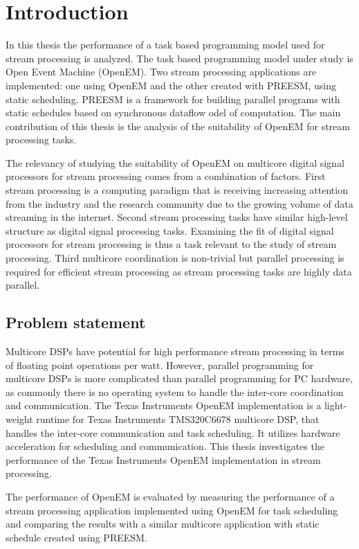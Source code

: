 \chapter{Introduction}
\label{chapter:introduction}
In this thesis the performance of a task based programming model used for stream processing is analyzed. The task based programming model under study is Open Event Machine (OpenEM). Two stream processing applications are implemented: one using OpenEM and the other created with PREESM, using static scheduling. PREESM is a framework for building parallel programs with static schedules based on synchronous dataflow odel of computation. The main contribution of this thesis is the analysis of the suitability of OpenEM for stream processing tasks.

The relevancy of studying the suitability of OpenEM on multicore digital signal processors for stream processing comes from a combination of factors. First stream processing is a computing paradigm that is receiving increasing attention from the industry and the research community due to the growing volume of data streaming in the internet. Second stream processing tasks have similar high-level structure as digital signal processing tasks. Examining the fit of digital signal processors for stream processing is thus a task relevant to the study of stream processing. Third multicore coordination is non-trivial but parallel processing is required for efficient stream processing as stream processing tasks are highly data parallel.

\section{Problem statement}
\label{section:problem-statement}
Multicore DSPs have potential for high performance stream processing in terms of floating point operations per watt. However, parallel programming for multicore DSPs is more complicated than parallel programming for PC hardware, as commonly there is no operating system to handle the inter-core coordination and communication. The Texas Instruments OpenEM implementation is a light-weight runtime for Texas Instruments TMS320C6678 multicore DSP, that handles the inter-core communication and task scheduling. It utilizes hardware acceleration for scheduling and communication. This thesis investigates the performance of the Texas Instruments OpenEM implementation in stream processing.

The performance of OpenEM is evaluated by measuring the performance of a stream processing application implemented using OpenEM for task scheduling and comparing the results with a similar multicore application with static schedule created using PREESM.


